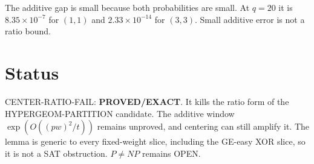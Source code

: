\documentclass[11pt]{article}
\begin{document}
The additive gap is small because both probabilities are small. At $q=20$ it is $8.35\times 10^{-7}$ for $(1,1)$ and $2.33\times 10^{-14}$ for $(3,3)$. Small additive error is not a ratio bound.

\section{Status}
CENTER-RATIO-FAIL: \textbf{PROVED/EXACT}. It kills the ratio form of the HYPERGEOM-PARTITION candidate. The additive window $\exp(O((pw)^2/t))$ remains unproved, and centering can still amplify it. The lemma is generic to every fixed-weight slice, including the GE-easy XOR slice, so it is not a SAT obstruction. $P\ne NP$ remains OPEN.
\end{document}
